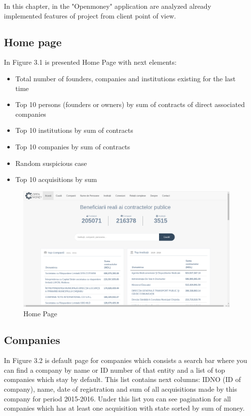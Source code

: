 \documentclass[12pt,a4paper,titlepage]{article}
\begin{document}
In this chapter, in the "Openmoney" application are analyzed already implemented features of project from client point of view.

\subsection{Home page}

In Figure 3.1 is presented Home Page with next elements:
	\begin{itemize}
	\item Total number of founders, companies and institutions existing for the last time
	\item Top 10 persons (founders or owners) by sum of contracts of direct associated companies
	\item Top 10 institutions by sum of contracts
	\item Top 10 companies by sum of contracts
	\item Random suspicious case
	\item Top 10 acquisitions by sum
	\end{itemize}

\begin{figure}[!ht] 
	\renewcommand\thefigure{3.1} %
	\centering 
	\includegraphics[width=17cm]{home.png} 
	\caption{ Home Page }\label{fig:home} 
	\end{figure}
	
\subsection{Companies}

In Figure 3.2 is default page for companies which consists a search bar where you can find a company by name or ID number of that entity and a list of top companies which stay by default. This list contains next columns: IDNO (ID of company), name, date of registration and sum of all acquisitions made by this company for period 2015-2016. Under this list you can see pagination for all companies which has at least one acquisition with state sorted by sum of money.\\
\end{document}
